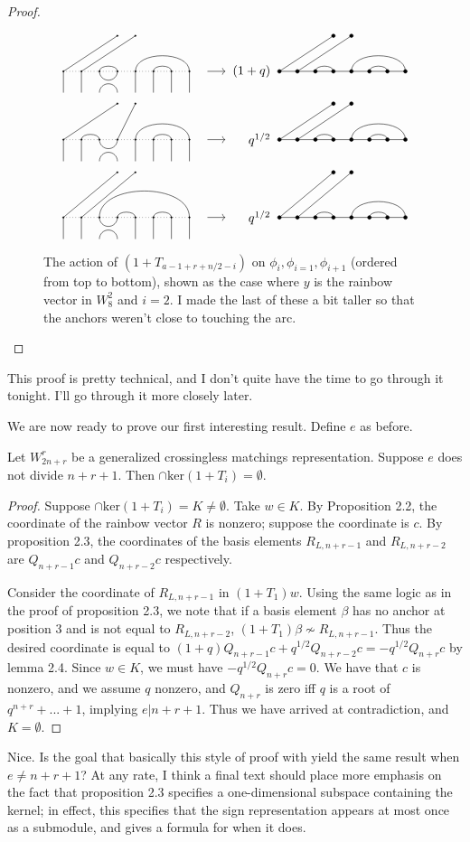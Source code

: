 \documentclass{amsart}
\begin{document}
\begin{proof}
	
	\begin{figure}
		\[
		\GeneralizedAction{8}{3/4,5/8,6/7}{2}{1/1,2/2}{1}{3}{3/4,5/8,6/7}{1/1,2/2}{(1+q)}
		\]
		\[
		\GeneralizedAction{8}{2/3,5/8,6/7}{2}{1/1,4/2}{1}{3}{3/4,5/8,6/7}{1/1,2/2}{q^{1/2}}
		\]
		\[
		\GeneralizedAction{8}{3/8,4/5,6/7}{2}{1/1,2/2}{1.25}{3}{3/4,5/8,6/7}{1/1,2/2}{q^{1/2}}
		\]
    \caption{The action of $(1+T_{a-1+r+n/2-i})$ on $\phi_i,\phi_{i=1},\phi_{i+1}$ (ordered from top to bottom), shown as the case where $y$ is the rainbow vector in $W_{8}^2$ and $i=2$.{\color{magenta} I made the last of these a bit taller so that the anchors weren't close to touching the arc.}}
		\label{Action}
	\end{figure}
\end{proof}	
{\color{magenta} This proof is pretty technical, and I don't quite have the time to go through it tonight. I'll go through it more closely later.}

We are now ready to prove our first interesting result. Define $e$ as before.

\begin{proposition}
	Let $W_{2n+r}^r$ be a generalized crossingless matchings representation. Suppose $e$ does not divide $n+r+1$. Then $\cap\text{ker}(1+T_i)=\emptyset$.
\end{proposition}

\begin{proof}
	Suppose $\cap\text{ker}(1+T_i)=K\not=\emptyset$. Take $w\in K$. By Proposition 2.2, the coordinate of the rainbow vector $R$ is nonzero; suppose the coordinate is $c$. By proposition 2.3, the coordinates of the basis elements $R_{L,n+r-1}$ and $R_{L,n+r-2}$ are $Q_{n+r-1}c$ and $Q_{n+r-2}c$ respectively.
	
	Consider the coordinate of $R_{L,n+r-1}$ in $(1+T_1)w$. Using the same logic as in the proof of proposition 2.3, we note that if a basis element $\beta$ has no anchor at position $3$ and is not equal to $R_{L,n+r-2}$, $(1+T_1)\beta\not\sim R_{L,n+r-1}$. Thus the desired coordinate is equal to $(1+q)Q_{n+r-1}c+q^{1/2}Q_{n+r-2}c=-q^{1/2}Q_{n+r}c$ by lemma 2.4. Since $w\in K$, we must have $-q^{1/2}Q_{n+r}c=0$. We have that $c$ is nonzero, and we assume $q$ nonzero, and $Q_{n+r}$ is zero iff $q$ is a root of $q^{n+r}+...+1$, implying $e|n+r+1$. Thus we have arrived at contradiction, and $K=\emptyset$.
\end{proof}
{\color{magenta} Nice. Is the goal that basically this style of proof with yield the same result when $e \neq n + r + 1$? At any rate, I think a final text should place more emphasis on the fact that proposition 2.3 specifies a one-dimensional subspace containing the kernel;
in effect, this specifies that the sign representation appears at most once as a submodule, and gives a formula for when it does.}
\end{document}
